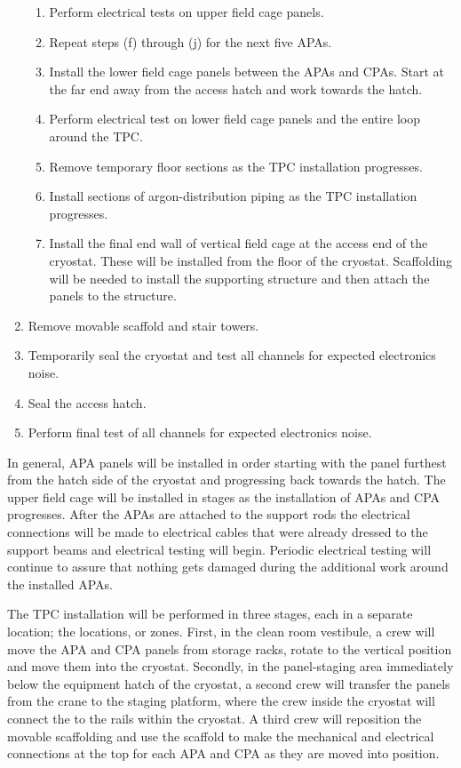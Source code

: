 \begin{enumerate}
\begin{enumerate}
   \item Perform electrical tests on upper field cage panels.
   \item Repeat steps (f) through (j) for the next five APAs.
   \item Install the lower field cage panels between the APAs and CPAs.  Start at the far end away from the access hatch and work towards the hatch. 
   \item Perform electrical test on lower field cage panels and the entire loop around the TPC.
   \item Remove temporary floor sections as the TPC installation progresses.
   \item Install sections of argon-distribution piping as the TPC installation progresses.
   \item Install the final end wall of vertical field cage at the access end of the cryostat.  These will be installed from the floor of the cryostat.  Scaffolding will be needed to install the supporting structure and then attach the panels to the structure.
   \end{enumerate}
\item Remove movable scaffold and stair towers.
\item Temporarily seal the cryostat and test all channels for expected electronics noise.
\item Seal the access hatch.
\item Perform final test of all channels for expected electronics noise.
\end{enumerate}
 
In general, APA panels will be installed in order starting with the panel furthest from the hatch side of the cryostat and progressing back towards the hatch. The upper field cage will be installed in stages as the installation of APAs and CPA progresses.  After the APAs are attached to the support rods the electrical connections will be made to electrical cables that were already dressed to the support beams and electrical testing will begin. Periodic electrical testing will continue to assure that nothing gets  damaged during the additional work around the installed APAs.  

The TPC installation will be performed in three stages, each in a separate location; the locations, or 
zones. First, in the clean room vestibule, a crew will move the APA and CPA panels from storage racks, rotate to the vertical position and move them into the cryostat. Secondly, in the panel-staging area immediately below the equipment hatch of the cryostat, 
a second crew will transfer the panels from the crane to the staging platform, where the crew inside the cryostat will connect the to the rails within the cryostat. A third crew will reposition the movable scaffolding and use the scaffold to make the mechanical and electrical connections at the top for each APA and CPA as they are moved into position.  

